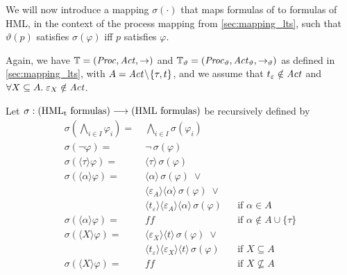 %
\begin{isabellebody}%
%
%
\isadelimtheory
%
\endisadelimtheory
%
\isatagtheory
%
\endisatagtheory
{\isafoldtheory}%
%
\isadelimtheory
%
\endisadelimtheory
%
\isadelimdocument
%
\endisadelimdocument
%
\isatagdocument
%
\isamarkuptrue%
%
\endisatagdocument
{\isafolddocument}%
%
\isadelimdocument
%
\endisadelimdocument
%
\begin{isamarkuptext}%
\label{sec:mapping_formulas}%
\end{isamarkuptext}\isamarkuptrue%
%
\begin{isamarkuptext}%
We will now introduce a mapping $\sigma(\cdot)$ that maps formulas of \HMLt{} to formulas of HML, in the context of the process mapping from \cref{sec:mapping_lts}, such that $\vartheta(p)$ satisfies $\sigma(\varphi)$ iff $p$ satisfies $\varphi$.

Again, we have $\mathbb{T} = (\mathit{Proc}, \mathit{Act}, \rightarrow)$ and $\mathbb{T}_\vartheta = (\mathit{Proc}_\vartheta, \mathit{Act}_\vartheta, \rightarrow_\vartheta)$ as defined in \cref{sec:mapping_lts}, with $A = \mathit{Act} \!\setminus\! \{\tau, t\}$, and we assume that $t_\varepsilon \notin \mathit{Act}$ and $\forall X \subseteq A.\; \varepsilon_X \notin \mathit{Act}$.

Let $\sigma : (\text{HML\textsubscript{t}{} formulas}) \longrightarrow (\text{HML formulas})$ be recursively defined by
\begin{align*}
    \sigma(\textstyle\bigwedge_{i \in I} \varphi_i) =\;& \textstyle\bigwedge_{i \in I} \sigma(\varphi_i) &\\
    \sigma(\neg\varphi) =\;& \neg\,\sigma(\varphi)\\
    \sigma(\langle\tau\rangle\varphi) =\;& \langle\tau\rangle\,\sigma(\varphi)\\
    \sigma(\langle\alpha\rangle\varphi) =\;& 
        \langle\alpha\rangle\,\sigma(\varphi)\;\vee\\
        &\langle\varepsilon_A\rangle\langle\alpha\rangle\,\sigma(\varphi)\;\vee\\ 
        &\langle{}t_\varepsilon\rangle\langle\varepsilon_A\rangle\langle\alpha\rangle\,\sigma(\varphi) && \text{if $\alpha \in A$}\\
    \sigma(\langle\alpha\rangle\varphi) =\;& f\!\!f && \text{if $\alpha \notin A \cup \{\tau\}$}\\
    \sigma(\langle{}X\rangle\varphi) =\;&
        \langle\varepsilon_X\rangle\langle{}t\rangle\,\sigma(\varphi)\;\vee\\
        &\langle{}t_\varepsilon\rangle\langle\varepsilon_X\rangle\langle{}t\rangle\,\sigma(\varphi) && \text{if $X \subseteq A$} \\
    \sigma(\langle{}X\rangle\varphi) =\;& f\!\!f && \text{if $X \not\subseteq A$}
\end{align*}


\end{isamarkuptext}
\end{isabellebody}
